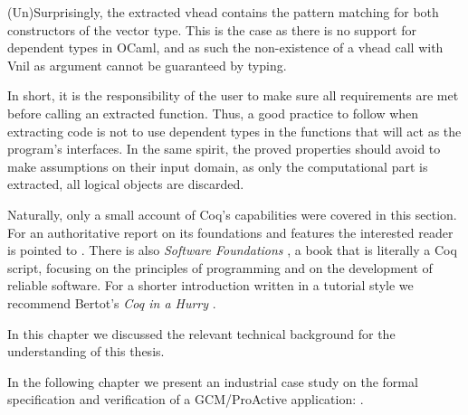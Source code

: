 	
	\noindent (Un)Surprisingly, the extracted \textsf{vhead} contains the pattern matching for
	both constructors of the \textsf{vector} type.	This is the case as there is no 
	support for dependent types in OCaml, and as such the non-existence
	of a \textsf{vhead} call with	\textsf{Vnil} as argument cannot be guaranteed by typing.
	
	In short, it is the responsibility of the user to make sure all requirements are met before calling
	an extracted function. Thus, a good practice to follow when extracting code is not to use
	dependent types in the functions that will act as the program's interfaces. In the same spirit,
	the proved properties should avoid to make assumptions on their input domain,
	as only the computational part is extracted, all logical objects are discarded.


	



	Naturally, only a small account of Coq's capabilities were covered in this section. For an authoritative 
	report on its foundations and features the interested reader is pointed to \cite{opac-b1101046}.
	There is also \textit{Software Foundations}	\cite{Pierce:SF}, a book that is literally a Coq script, 
	focusing on the principles of programming and on the development of reliable software.
	For a shorter introduction written in a tutorial style we recommend Bertot's \textit{Coq in a Hurry}
	 \cite{DBLP:journals/corr/abs-cs-0603118}.




	\chapbreak
	
	In this chapter we discussed the relevant technical background for the understanding of this thesis.
	
			In the following chapter we present an industrial case study on the formal specification and verification
	of a \ac{GCM}/ProActive application: \thehm. 
		
	
	


